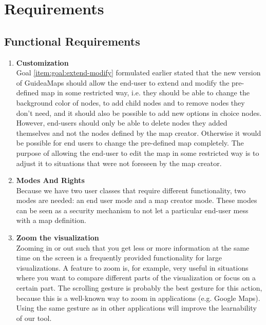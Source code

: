 \section{Requirements}\label{sec:requirements}

\subsection{Functional Requirements}\label{sec:functional-requirements}

\begin{enumerate}[label=\textbf{\arabic*}., ref=\arabic*]
	
	\item \textbf{Customization\label{item:customization}} \hfill \\
	Goal \ref{item:goal:extend-modify} formulated earlier stated that the new version of GuideaMaps should allow the end-user to extend and modify the pre-defined map in some restricted way, i.e. they should be able to change the background color of nodes, to add child nodes and to remove nodes they don't need, and it should also be possible to add new options in choice nodes. However, end-users should only be able to delete nodes they added themselves and not the nodes defined by the map creator. Otherwise it would be possible for end users to change the pre-defined map completely. The purpose of allowing the end-user to edit the map in some restricted way is to adjust it to situations that were not foreseen by the map creator.
  
	\item \textbf{Modes And Rights\label{item:modes-rights}} \hfill \\
	Because we have two user classes that require different functionality, two modes are needed: an end user mode and a map creator mode. These modes can be seen as a security mechanism to not let a particular end-user mess with a map definition.
  
	\item \textbf{Zoom the visualization}\label{item:zoom} \hfill \\
	Zooming in or out such that you get less or more information at the same time on the screen is a frequently provided functionality for large visualizations. A feature to zoom is, for example, very useful in situations where you want to compare different parts of the visualization or focus on a certain part. The scrolling gesture is probably the best gesture for this action, because this is a well-known way to zoom in applications (e.g. Google Maps). Using the same gesture as in other applications will improve the learnability of our tool.
	

\end{enumerate}
